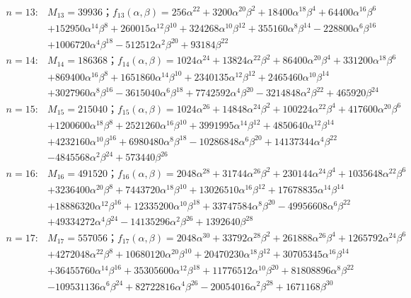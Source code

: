 \begin{flushleft}
\begin{align*}
n=13:&M_{13}=39936；f_{13}(\alpha,\beta)=256\alpha^{22}+3200\alpha^{20}\beta^2+18400\alpha^{18}\beta^4+64400\alpha^{16}\beta^6\\ 
&+152950\alpha^{14}\beta^{8}+260015\alpha^{12}\beta^{10}+324268\alpha^{10}\beta^{12}+355160\alpha^8\beta^{14}-228800\alpha^6\beta^{16}\\ &+1006720\alpha^4\beta^{18}-512512\alpha^2\beta^{20}+93184\beta^{22} \\
n=14:&M_{14}=186368；f_{14}(\alpha,\beta)=1024\alpha^{24}+13824\alpha^{22}\beta^2+86400\alpha^{20}\beta^4+331200\alpha^{18}\beta^6\\ 
&+869400\alpha^{16}\beta^{8}+1651860\alpha^{14}\beta^{10}+2340135\alpha^{12}\beta^{12}+2465460\alpha^{10}\beta^{14}\\ &+3027960\alpha^8\beta^{16}-3615040\alpha^6\beta^{18}+7742592\alpha^4\beta^{20}-3214848\alpha^2\beta^{22}+465920\beta^{24}\\
n=15:&M_{15}=215040；f_{15}(\alpha,\beta)=1024\alpha^{26}+14848\alpha^{24}\beta^2+100224\alpha^{22}\beta^4+417600\alpha^{20}\beta^6\\ 
&+1200600\alpha^{18}\beta^{8}+2521260\alpha^{16}\beta^{10}+3991995\alpha^{14}\beta^{12}+4850640\alpha^{12}\beta^{14}\\ 
&+4232160\alpha^{10}\beta^{16}+6980480\alpha^8\beta^{18}-10286848\alpha^6\beta^{20}+14137344\alpha^4\beta^{22}\\ 
&-4845568\alpha^2\beta^{24}+573440\beta^{26} \\
n=16:&M_{16}=491520；f_{16}(\alpha,\beta)=2048\alpha^{28}+31744\alpha^{26}\beta^2+230144\alpha^{24}\beta^4+1035648\alpha^{22}\beta^6\\ 
&+3236400\alpha^{20}\beta^{8}+7443720\alpha^{18}\beta^{10}+13026510\alpha^{16}\beta^{12}+17678835\alpha^{14}\beta^{14}\\ 
&+18886320\alpha^{12}\beta^{16}+12335200\alpha^{10}\beta^{18}+33747584\alpha^8\beta^{20}-49956608\alpha^6\beta^{22}\\ &+49334272\alpha^4\beta^{24}-14135296\alpha^2\beta^{26}+1392640\beta^{28}\\
n=17:&M_{17}=557056；f_{17}(\alpha,\beta)=2048\alpha^{30}+33792\alpha^{28}\beta^2+261888\alpha^{26}\beta^4+1265792\alpha^{24}\beta^6\\ 
&+4272048\alpha^{22}\beta^{8}+10680120\alpha^{20}\beta^{10}+20470230\alpha^{18}\beta^{12}+30705345\alpha^{16}\beta^{14}\\ 
&+36455760\alpha^{14}\beta^{16}+35305600\alpha^{12}\beta^{18}+11776512\alpha^{10}\beta^{20}+81808896\alpha^8\beta^{22}\\ &-109531136\alpha^6\beta^{24}+82722816\alpha^4\beta^{26}-20054016\alpha^2\beta^{28}+1671168\beta^{30}\\

\end{align*}
\end{flushleft}
